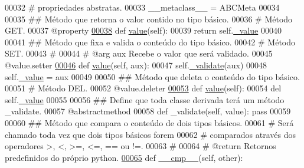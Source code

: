 \begin{DoxyCode}
00032     \textcolor{comment}{#   propriedades abstratas.}
00033     \_\_metaclass\_\_ = ABCMeta
00034 
00035     \textcolor{comment}{## Método que retorna o valor contido no tipo básico.}
00036     \textcolor{comment}{#   Método GET.}
00037     @property
\hypertarget{BaseUnit_8py_source_l00038}{}\hyperlink{classELO_1_1BaseUnit_1_1IfBaseType_a2534c3548a8e5991dde0a64b4f0b542b}{00038}     \textcolor{keyword}{def }\hyperlink{classELO_1_1BaseUnit_1_1IfBaseType_a2534c3548a8e5991dde0a64b4f0b542b}{value}(self):
00039         \textcolor{keywordflow}{return} self.\hyperlink{classELO_1_1BaseUnit_1_1IfBaseType_ad05d9d377fc4b99743c022cc8f6019d7}{\_value}
00040 
00041     \textcolor{comment}{## Método que fixa e valida o conteúdo do tipo básico.}
00042     \textcolor{comment}{#   Método SET.}
00043     \textcolor{comment}{#}
00044     \textcolor{comment}{#   @arg aux Recebe o valor que será validado.}
00045     @value.setter
\hypertarget{BaseUnit_8py_source_l00046}{}\hyperlink{classELO_1_1BaseUnit_1_1IfBaseType_af9e438002f812334ca436deec3078c6f}{00046}     \textcolor{keyword}{def }\hyperlink{classELO_1_1BaseUnit_1_1IfBaseType_a2534c3548a8e5991dde0a64b4f0b542b}{value}(self, aux):
00047         self.\hyperlink{classELO_1_1BaseUnit_1_1IfBaseType_acf84c5906a39b605a23ab68c4ca1dd19}{\_validate}(aux)
00048         self.\hyperlink{classELO_1_1BaseUnit_1_1IfBaseType_ad05d9d377fc4b99743c022cc8f6019d7}{\_value} = aux
00049 
00050     \textcolor{comment}{## Método que deleta o conteúdo do tipo básico.}
00051     \textcolor{comment}{#   Método DEL.}
00052     @value.deleter
\hypertarget{BaseUnit_8py_source_l00053}{}\hyperlink{classELO_1_1BaseUnit_1_1IfBaseType_a2534c3548a8e5991dde0a64b4f0b542b}{00053}     \textcolor{keyword}{def }\hyperlink{classELO_1_1BaseUnit_1_1IfBaseType_a2534c3548a8e5991dde0a64b4f0b542b}{value}(self):
00054         del self.\hyperlink{classELO_1_1BaseUnit_1_1IfBaseType_ad05d9d377fc4b99743c022cc8f6019d7}{\_value}
00055 
00056     \textcolor{comment}{## Define que toda classe derivada terá um método \_validate.}
00057     @abstractmethod
00058     \textcolor{keyword}{def }\_validate(self, value): \textcolor{keyword}{pass}
00059 
00060     \textcolor{comment}{## Método que compara o conteúdo de dois tipos básicos.}
00061     \textcolor{comment}{#   Será chamado toda vez que dois tipos básicos forem}
00062     \textcolor{comment}{#   comparados através dos operadores >, <, >=, <=, == ou !=.}
00063     \textcolor{comment}{#}
00064     \textcolor{comment}{#   @return Retornos predefinidos do próprio python.}
\hypertarget{BaseUnit_8py_source_l00065}{}\hyperlink{classELO_1_1BaseUnit_1_1IfBaseType_a22d6f30c4d9504a9c20d0ff5a538544d}{00065}     \textcolor{keyword}{def }\hyperlink{classELO_1_1BaseUnit_1_1IfBaseType_a22d6f30c4d9504a9c20d0ff5a538544d}{\_\_cmp\_\_}(self, other):

\end{DoxyCode}
